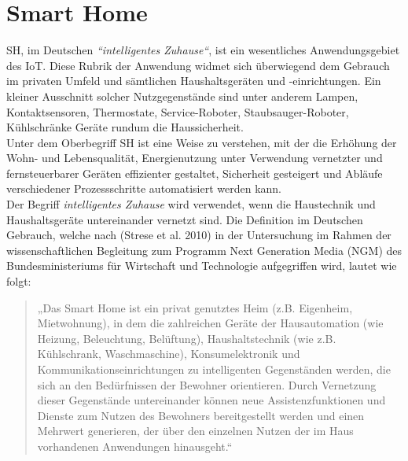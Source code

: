 
\section{Smart Home}
\label{sec:smartHome}
    \acl{SH}, im Deutschen \textit{“intelligentes Zuhause“}, ist ein wesentliches Anwendungsgebiet des \acs{IoT}. 
    Diese Rubrik der Anwendung widmet sich überwiegend dem Gebrauch im privaten Umfeld und sämtlichen Haushaltsgeräten 
    und -einrichtungen. Ein kleiner Ausschnitt solcher Nutzgegenstände sind unter anderem Lampen, Kontaktsensoren, 
    Thermostate, Service-Roboter, Staubsauger-Roboter, Kühlschränke Geräte rundum die Haussicherheit. 
    \\ 
    Unter dem Oberbegriff \acl{SH} ist eine Weise zu verstehen, mit der die Erhöhung der Wohn- und Lebensqualität, 
    Energienutzung unter Verwendung vernetzter und fernsteuerbarer Geräten effizienter gestaltet, Sicherheit gesteigert 
    und Abläufe verschiedener Prozessschritte automatisiert werden kann.
    \\ 
    Der Begriff \textit{intelligentes Zuhause} wird verwendet, wenn die Haustechnik und Haushaltsgeräte untereinander 
    vernetzt sind. Die Definition im Deutschen Gebrauch, welche nach (Strese et al. 2010) in der Untersuchung im Rahmen 
    der wissenschaftlichen Begleitung zum Programm Next Generation Media (NGM) des Bundesministeriums für Wirtschaft und 
    Technologie aufgegriffen wird, lautet wie folgt: 
    \begin{quote}
        „Das Smart Home ist ein privat genutztes Heim (z.B. Eigenheim, Mietwohnung), in dem die zahlreichen Geräte der 
        Hausautomation (wie Heizung, Beleuchtung, Belüftung), Haushaltstechnik (wie z.B. Kühlschrank, Waschmaschine), 
        Konsumelektronik und Kommunikationseinrichtungen zu intelligenten Gegenständen werden, die sich an den 
        Bedürfnissen der Bewohner orientieren. Durch Vernetzung dieser Gegenstände untereinander können neue 
        Assistenzfunktionen und Dienste zum Nutzen des Bewohners bereitgestellt werden und einen Mehrwert 
        generieren, der über den einzelnen Nutzen der im Haus vorhandenen Anwendungen hinausgeht.“ \cite{strese.2010m}
    \end{quote}

